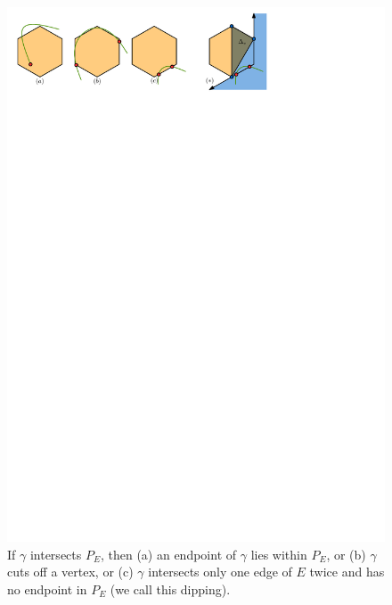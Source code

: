 \documentclass[a4paper, UKenglish]{lipics-v2018}
\begin{document}
\begin{figure}[h]
    \centering
    \includegraphics{../intersectionsearch}
    \caption{If $\gamma$ intersects $P_E$, then (a) an endpoint of $\gamma$ lies within $P_E$, or (b) $\gamma$ cuts off a vertex, or (c) $\gamma$ intersects only one edge of $E$ twice and has no endpoint in $P_E$ (we call this dipping).}
    \label{fig:intersectionsearch}
\end{figure}
\end{document}
